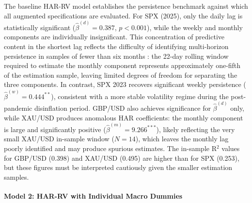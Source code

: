 \documentclass[12pt,a4paper]{report}
\begin{document}
The baseline HAR-RV model establishes the persistence benchmark against which all augmented specifications are evaluated. For SPX (2025), only the daily lag is statistically significant ($\hat{\beta}^{(d)} = 0.387$, $p < 0.001$), while the weekly and monthly components are individually insignificant. This concentration of predictive content in the shortest lag reflects the difficulty of identifying multi-horizon persistence in samples of fewer than six months \citep{Corsi2009}: the 22-day rolling window required to estimate the monthly component represents approximately one-fifth of the estimation sample, leaving limited degrees of freedom for separating the three components. In contrast, SPX 2023 recovers significant weekly persistence ($\hat{\beta}^{(w)} = 0.444^{**}$), consistent with a more stable volatility regime during the post-pandemic disinflation period. GBP/USD also achieves significance for $\hat{\beta}^{(d)}$ only, while XAU/USD produces anomalous HAR coefficients: the monthly component is large and significantly positive ($\hat{\beta}^{(m)} = 9.266^{***}$), likely reflecting the very small XAU/USD in-sample window ($N = 14$), which leaves the monthly lag poorly identified and may produce spurious estimates. The in-sample R$^2$ values for GBP/USD (0.398) and XAU/USD (0.495) are higher than for SPX (0.253), but these figures must be interpreted cautiously given the smaller estimation samples.

\paragraph{Model 2: HAR-RV with Individual Macro Dummies}\mbox{}\\
\end{document}
